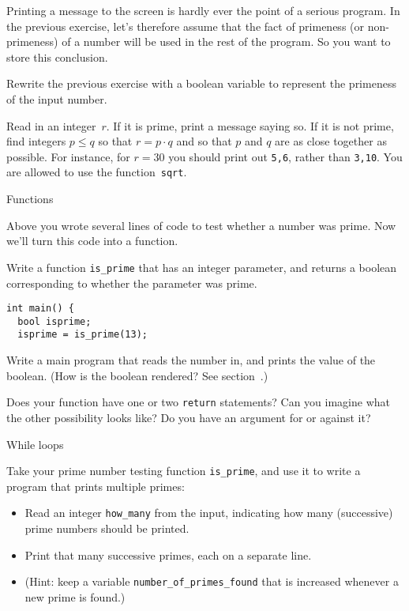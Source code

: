 Printing a message to the screen is hardly ever the point of a serious program.
In the previous exercise, let's therefore assume that the fact of primeness
(or non-primeness)
of a number
will be used in the rest of the program. So you want to store this conclusion.

\begin{exercise}
  \label{ex:prime:test2}
  Rewrite the previous exercise with a boolean variable to represent
  the primeness of the input number.
\end{exercise}

\begin{exercise}
  \label{ex:squaregrid}
  Read in an integer~$r$. If it is prime, print a message saying so.
  If it is not prime, find integers $p\leq q$ so that $r=p\cdot q$ and so
  that $p$ and $q$ are as close together as possible.
  For instance, for $r=30$ you should print out \lstinline{5,6}, rather than
  \lstinline{3,10}. You are allowed to use the function~\lstinline{sqrt}.
\end{exercise}

 {Functions}


Above you wrote several lines of code to test whether a number was prime.
Now we'll turn this code into a function.

\begin{exercise}
  \label{ex:prime:func}
  Write a function \lstinline{is_prime} that has an integer parameter, and returns a boolean
  corresponding to whether the parameter was prime.
\begin{lstlisting}
int main() {
  bool isprime;
  isprime = is_prime(13);
\end{lstlisting}
Write a main program that reads the number in,
and prints the value of the boolean.
(How is the boolean rendered? See section~.)

  Does your function have one or two \lstinline{return} statements?
  Can you imagine what the other possibility looks like?
  Do you have an argument for or against it?
\end{exercise}

 {While loops}


\begin{exercise}
  \label{ex:prime:while}
  Take your prime number testing function \lstinline{is_prime}, and use it to
  write a program that prints multiple primes:
  \begin{itemize}
  \item Read an integer \lstinline{how_many} from the input, indicating how
    many (successive) prime numbers should be printed.
  \item Print that many successive primes, each on a separate line.
  \item (Hint: keep a variable
    \lstinline{number_of_primes_found} that is increased whenever a new prime is found.)
  \end{itemize}
\end{exercise}

